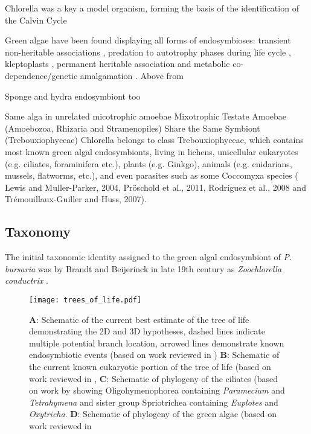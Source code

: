 Chlorella was a key a model organism, forming the basis of the identification 
of the Calvin Cycle \citep{benson1948path}


Green algae have been found displaying all forms of endosymbioses:
transient non-heritable associations \citep{Reisser1993}, 
predation to autotrophy phases during life cycle \citep{Okamoto2005},
kleptoplasts \citep{Schnepf1993}, permanent heritable
association \citep{Siegel1965} and metabolic co-dependence/genetic
amalgamation \citep{Margulis1993}.
Above from \citep{Sano2008}





Sponge and hydra endosymbiont too

Same alga in unrelated micotrophic amoebae \citep{Gomaa2014}
Mixotrophic Testate Amoebae
(Amoebozoa, Rhizaria and
Stramenopiles) Share the Same Symbiont
(Trebouxiophyceae)
Chlorella belongs to class Trebouxiophyceae, which contains most known green algal endosymbionts, living in lichens, unicellular eukaryotes (e.g. ciliates, foraminifera etc.), plants (e.g. Ginkgo), animals (e.g. cnidarians, mussels, flatworms, etc.), and even parasites such as some Coccomyxa species ( Lewis and Muller-Parker, 2004, Pröschold et al., 2011, Rodríguez et al., 2008 and Trémouillaux-Guiller and Huss, 2007).
\citep{Gomaa2014}


\subsection{Taxonomy}
The initial taxonomic identity assigned to the green algal endosymbiont of \textit{P. bursaria} was by Brandt and Beijerinck in 
late 19th century as \textit{Zoochlorella conductrix} \citep{Hoshina2010}.







 



\begin{figure}
    \texttt{[image: trees\_of\_life.pdf]}
    \caption[Taxonomic Context of Host and Endosymbiont]{\textbf{A}: Schematic of the current best estimate of the tree of life demonstrating the 2D and 3D hypotheses,
dashed lines indicate multiple potential branch location, arrowed lines demonstrate known endosymbiotic events (based on work reviewed in \citep{Gribaldo2010})
\textbf{B}: Schematic of the current known eukaryotic portion of the tree of life (based on work reviewed in \citep{Burki2014,Adl2013},
\textbf{C}: Schematic of phylogeny of the ciliates (based on work by \citep{Bachvaroff2011} showing Oligohymenophorea containing \textit{Paramecium} and \textit{Tetrahymena} and sister group Spriotrichea containing \textit{Euplotes} and \textit{Oxytricha}.
\textbf{D}: Schematic of phylogeny of the green algae (based on work reviewed in \citep{Leliaert2012}}
    \label{fig:tol}
\end{figure}

